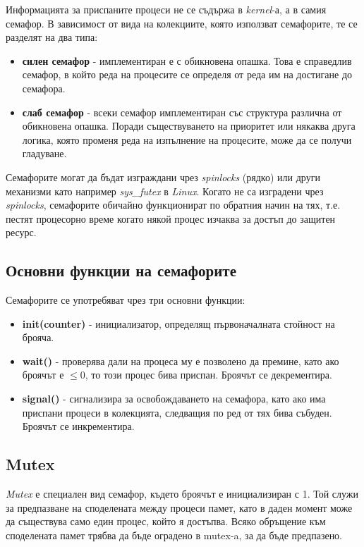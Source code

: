 \documentclass[fleqn,12pt]{article}
\begin{document}
Информацията за приспаните процеси не се съдържа в \textit{kernel}-а, а в самия семафор.
\bigbreak
В зависимост от вида на колекциите, която използват семафорите, те се разделят на два типа:

\begin{itemize}
    \item \textbf{силен семафор} - имплементиран е с обикновена опашка. Това е справедлив семафор, в който реда на процесите се определя от реда им на достигане до семафора.
    \item \textbf{слаб семафор} - всеки семафор имплементиран със структура различна от обикновена опашка. Поради съществуването на приоритет или някаква друга логика, която променя реда на изпълнение на процесите, може да се получи гладуване.
\end{itemize}
    
Семафорите могат да бъдат изграждани чрез \textit{spinlocks} (рядко) или други механизми като например \textit{sys\_futex} в \textit{Linux}.
Когато не са изградени чрез \textit{spinlocks}, семафорите обичайно функционират по обратния начин на тях, т.е. пестят процесорно време когато някой процес изчаква за достъп до защитен ресурс.

\subsection{Основни функции на семафорите}

Семафорите се употребяват чрез три основни функции:

\begin{itemize}
    \item \textbf{init(counter)} - инициализатор, определящ първоначалната стойност на брояча.
    \item \textbf{wait()} - проверява дали на процеса му е позволено да премине, като ако броячът е $\leq 0$, то този процес бива приспан. Броячът се декрементира.
    \item \textbf{signal()} - сигнализира за освобождаването на семафора, като ако има приспани процеси в колекцията, следващия по ред от тях бива събуден. Броячът се инкрементира.
\end{itemize}

\subsection{Mutex}

\textit{Mutex} е специален вид семафор, където броячът е инициализиран с 1.
Той служи за предпазване на споделената между процеси памет, като в даден момент може да съществува само един процес, който я достъпва.
Всяко обръщение към споделената памет трябва да бъде оградено в mutex-a, за да бъде предпазено.
\end{document}
